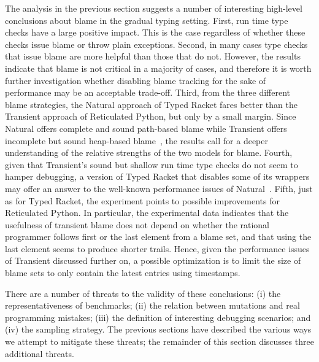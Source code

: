 


The analysis in the previous section suggests a number of interesting
high-level conclusions about blame in the gradual typing setting.  First,
run time type checks have a large positive impact. This is the case
regardless of whether these checks issue blame or throw plain
exceptions.  Second, in many cases type checks that issue blame are more
helpful than those that do not. However, the results indicate that blame
is not critical in a majority of cases, and therefore it is worth further
investigation whether disabling blame tracking for the sake of performance
may be   an acceptable trade-off. Third, from the three different blame
strategies, the Natural approach of Typed Racket fares better than the
Transient approach of Reticulated Python, but only by a small margin.
Since Natural offers complete and sound path-based blame while Transient
offers incomplete but sound heap-based blame~\cite{gfd-oopsla-2019}, the
results call for a deeper understanding of the relative strengths of the
two models for blame.  Fourth, given that Transient's sound but shallow
run time type checks do not seem to hamper debugging, a version of Typed
Racket that disables some of its wrappers may offer an answer to the
well-known performance issues of Natural~\cite{gtnffvf-jfp-2019}.  Fifth,
just as for Typed Racket, the experiment points to possible improvements
for Reticulated Python. In particular, the experimental data indicates
that the usefulness of transient blame does not depend on whether  the
rational programmer follows first or the last element from a blame set,
and that using the last element seems to produce shorter trails.  Hence,
given the performance issues of Transient discussed further on, a possible
optimization is to limit the size of blame sets to only contain the latest
entries using timestamps.

There are a number of threats to the validity of these conclusions: (i) the
representativeness of benchmarks; (ii) the relation between mutations and
real programming mistakes; (iii) the definition of interesting debugging
scenarios; and (iv) the sampling strategy. The previous sections
have described the various ways we attempt to mitigate these threats;
the remainder of this section discusses three additional threats.

